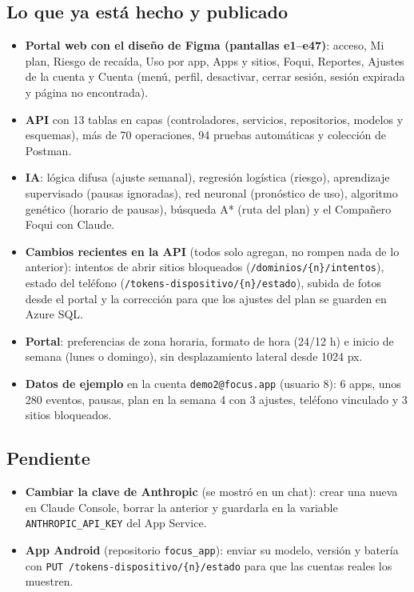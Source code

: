 \documentclass[11pt,a4paper]{article}
\newcommand{\ruta}[1]{\texttt{\color{marino}#1}}
\begin{document}
\subsection{Lo que ya está hecho y publicado}
\begin{itemize}[leftmargin=*]
  \item \textbf{Portal web con el diseño de Figma (pantallas e1--e47)}: acceso, Mi plan, Riesgo de recaída,
        Uso por app, Apps y sitios, Foqui, Reportes, Ajustes de la cuenta y Cuenta (menú, perfil,
        desactivar, cerrar sesión, sesión expirada y página no encontrada).
  \item \textbf{API} con 13 tablas en capas (controladores, servicios, repositorios, modelos y esquemas),
        más de 70 operaciones, 94 pruebas automáticas y colección de Postman.
  \item \textbf{IA}: lógica difusa (ajuste semanal), regresión logística (riesgo), aprendizaje supervisado
        (pausas ignoradas), red neuronal (pronóstico de uso), algoritmo genético (horario de pausas),
        búsqueda A* (ruta del plan) y el Compañero Foqui con Claude.
  \item \textbf{Cambios recientes en la API} (todos solo agregan, no rompen nada de lo anterior):
        intentos de abrir sitios bloqueados (\ruta{/dominios/\{n\}/intentos}), estado del teléfono
        (\ruta{/tokens-dispositivo/\{n\}/estado}), subida de fotos desde el portal y la corrección
        para que los ajustes del plan se guarden en Azure SQL.
  \item \textbf{Portal}: preferencias de zona horaria, formato de hora (24/12 h) e inicio de semana (lunes o domingo),
        sin desplazamiento lateral desde 1024 px.
  \item \textbf{Datos de ejemplo} en la cuenta \texttt{demo2@focus.app} (usuario 8): 6 apps,
        unos 280 eventos, pausas, plan en la semana 4 con 3 ajustes, teléfono vinculado y 3 sitios bloqueados.
\end{itemize}

\subsection{Pendiente}
\begin{itemize}[leftmargin=*]
  \item \textbf{Cambiar la clave de Anthropic} (se mostró en un chat): crear una nueva en Claude Console,
        borrar la anterior y guardarla en la variable \texttt{ANTHROPIC\_API\_KEY} del App Service.
  \item \textbf{App Android} (repositorio \texttt{focus\_app}): enviar su modelo, versión y batería con
        \ruta{PUT /tokens-dispositivo/\{n\}/estado} para que las cuentas reales los muestren.
\end{itemize}
\end{document}
